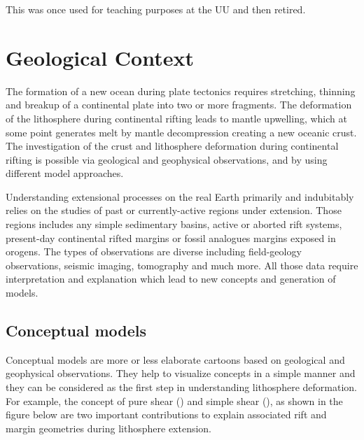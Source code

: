 {\color{red} \large This was once used for teaching purposes at the UU and then retired.}

\section*{Geological Context}

The formation of a new ocean during plate tectonics requires stretching, thinning and breakup of a 
continental plate into two or more fragments. The deformation of the lithosphere during continental 
rifting leads to mantle upwelling, which at some point generates melt by mantle decompression creating 
a new oceanic crust. The investigation of the crust and lithosphere deformation during continental 
rifting is possible via geological and geophysical observations, and by using different model approaches.

Understanding extensional processes on the real Earth primarily and indubitably relies on the studies of 
past or currently-active regions under extension. Those regions includes any simple sedimentary basins, 
active or aborted rift systems, present-day continental rifted margins or fossil analogues margins exposed 
in orogens. The types of observations are diverse including field-geology observations, seismic imaging, 
tomography and much more. All those data require interpretation and explanation which lead to new concepts and generation of models. 

\subsection*{Conceptual models}

Conceptual models are more or less elaborate cartoons based on geological and geophysical observations. 
They help to visualize concepts in a simple manner and they can be considered as the first step in understanding 
lithosphere deformation. For example, the concept of pure shear (\cite{mcke78}) and simple shear (\cite{webu86}), 
as shown in the figure below are two important contributions to explain associated rift and margin 
geometries during lithosphere extension. \cite{fort81}

